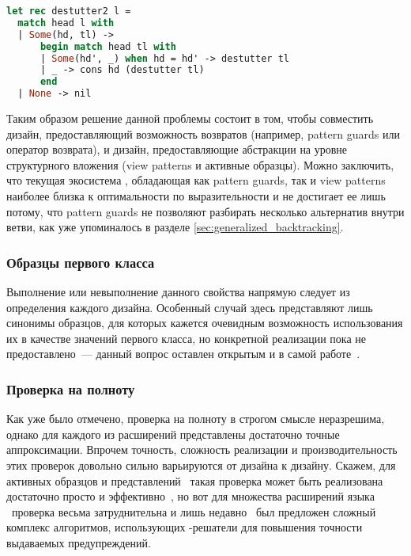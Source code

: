 \noindent
\begin{minipage}{\linewidth}
\begin{lstlisting}[language=ocaml, escapechar=@]
let rec destutter2 l = 
  match head l with
  | Some(hd, tl) ->
      begin match head tl with
      | Some(hd', _) when hd = hd' -> destutter tl
      | _ -> cons hd (destutter tl)
      end
  | None -> nil
\end{lstlisting}
\end{minipage}



Таким образом решение данной проблемы состоит в том, чтобы совместить дизайн, предоставляющий возможность возвратов (например, pattern guards или оператор возврата), и дизайн, предоставляющие абстракции на уровне структурного вложения (view patterns и активные образцы). Можно заключить, что текущая экосистема \Haskell{}, обладающая как pattern guards, так и view patterns наиболее близка к оптимальности по выразительности и не достигает ее лишь потому, что pattern guards не позволяют разбирать несколько альтернатив внутри ветви, как уже упоминалось в разделе \ref{sec:generalized_backtracking}.

\subsubsection{Образцы первого класса}

Выполнение или невыполнение данного свойства напрямую следует из определения каждого дизайна. Особенный случай здесь представляют лишь синонимы образцов, для которых кажется очевидным возможность использования их в качестве значений первого класса, но конкретной реализации пока не предоставлено~--- данный вопрос оставлен открытым и в самой работе~\cite{pickering2016pattern}.

\subsubsection{Проверка на полноту}

Как уже было отмечено, проверка на полноту в строгом смысле неразрешима, однако для каждого из расширений представлены достаточно точные аппроксимации. Впрочем точность, сложность реализации и производительность этих проверок довольно сильно варьируются от дизайна к дизайну. Скажем, для активных образцов и представлений \SML~такая проверка может быть реализована достаточно просто и эффективно~\cite{maranget2007warnings}, но вот для множества расширений языка \Haskell~проверка весьма затруднительна и лишь недавно~\cite{peytonjones2020lower} был предложен сложный комплекс алгоритмов, использующих %
 \SMT{}-решатели для повышения точности выдаваемых предупреждений.  

